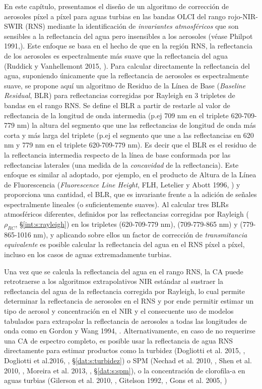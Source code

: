     En este capítulo, presentamos el diseño de un algoritmo de corrección de aerosoles píxel a píxel para aguas turbias en las bandas OLCI del rango rojo-NIR-SWIR (RNS) mediante la identificación de \textit{invariantes atmosféricos} que son sensibles a la reflectancia del agua pero insensibles a los aerosoles (véase Philpot 1991,\cite{philpot1991}).
    Este enfoque se basa en el hecho de que en la región RNS, la reflectancia de los aerosoles es espectralmente más suave que la reflectancia del agua (Ruddick y Vanhellemont 2015, \cite{ruddick2015}). Para calcular directamente la reflectancia del agua, suponiendo únicamente que la reflectancia de aerosoles es espectralmente suave, se propone aquí un algoritmo de Residuo de la Línea de Base (\textit{Baseline Residual}, BLR) para reflectancias corregidas por Rayleigh en 3 tripletes de bandas en el rango RNS. Se define el BLR a partir de restarle al valor de reflectancia de la longitud de onda intermedia (p.ej 709 nm en el triplete 620-709-779 nm) la altura del segmento que une las reflectancias de longitud de onda más corta y más larga del triplete (p.ej el segmento que une a las reflectancias en 620 nm y 779 nm en el triplete 620-709-779 nm). Es decir que el BLR es el residuo de la reflectancia intermedia respecto de la línea de base conformada por las reflectancias laterales (una medida de la \textit{concavidad} de la reflectancia). Este enfoque es similar al adoptado, por ejemplo, en el producto de Altura de la Línea de Fluorescencia (\textit{Fluorescence Line Height}, FLH, Letelier y Abott 1996, \cite{letelier1996}) y proporciona una cantidad, el BLR, que es invariante frente a la adición de señales espectralmente lineales (o suficientemente suaves). Al calcular tres BLRs atmosféricos diferentes, definidos por las reflectancias corregidas por Rayleigh ($\rho_{RC}$, \S \ref{int:s:rayleigh}) en los tripletes (620-709-779 nm), (709-779-865 nm) y (779-865-1016 nm), y aplicando sobre ellos un factor de corrección de \textit{transmitancia equivalente} es posible calcular la reflectancia del agua en el RNS píxel a píxel, incluso en los casos de aguas extremadamente turbias.

    Una vez que se calcula la reflectancia del agua en el rango RNS, la CA puede retrotraerse a los algoritmos extrapolativos NIR estándar al sustraer la reflectancia del agua de la reflectancia corregida por Rayleigh, lo cual permite determinar la reflectancia de aerosoles en el RNS y por ende permitir estimar un tipo de aerosol y concentración en el NIR y el consecuente uso de modelos tabulados para extrapolar la reflectancia de aerosoles a todas las longitudes de onda como en Gordon y Wang 1994, \cite{gordon1994}. Alternativamente, en caso de no requerirse una CA de espectro completo, es posible usar la reflectancia de agua RNS directamente para estimar productos como la turbidez (Dogliotti et al. 2015, \cite{dogliotti2015}, Dogliotti et al.2016, \cite{dogliotti2016}, \S \ref{dat:s:turbidez}) o SPM (Nechad et al. 2010, \cite{nechad2010}, Shen et al. 2010, \cite{shen2010}, Moreira et al. 2013, \cite{moreira2013}, \S \ref{dat:s:spm}), o la concentración de clorofila-a en aguas turbias (Gilerson et al. 2010, \cite{gilerson2010}, Gitelson 1992, \cite{gitelson1992}, Gons et al. 2005, \cite{gons2005})

